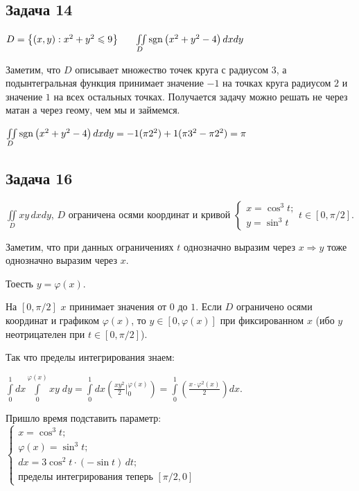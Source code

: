 \documentclass[a4paper, fleqn]{article}
\begin{document}
    \subsection*{Задача 14}
    $D = \left\{ (x, y): x^2 + y^2 \leqslant 9 \right\} \;\;\;\;\;\; \iint \limits_D \operatorname{\mathop{\mathrm{sgn}}} \left( x^2 + y^2 - 4 \right) dx dy$ 

    Заметим, что $D$ описывает множество точек круга с радиусом $3$, а подынтегральная функция принимает значение 
    $-1$ на точках круга радиусом $2$ и значение $1$ на всех остальных точках. 
    Получается задачу можно решать не через матан а через геому, чем мы и займемся.

    $\iint \limits_D \operatorname{\mathop{\mathrm{sgn}}} \left( x^2 + y^2 - 4 \right) dx dy = - 1 (\pi 2^2) + 1 (\pi 3^2 - \pi 2^2) = \pi$

    
    \subsection*{Задача 16}
    
    $\iint\limits_D xy \, dxdy$, $D$ ограничена осями координат и кривой $\begin{cases} 
    x = \cos^3 t;\\
    y = \sin^3 t
    \end{cases} t \in [0, \pi / 2].$
    
    Заметим, что при данных ограничениях $t$ однозначно выразим через $x \Rightarrow y$  тоже однозначно выразим через $x$.
    
    Тоесть $y = \varphi(x)$.
    
    На $[0, \pi/2]$ $x$ принимает значения от $0$ до $1$. Если $D$ ограничено осями координат и графиком $\varphi(x)$, то $y \in [0, \varphi(x)]$ при фиксированном $x$  (ибо $y$ неотрицателен при $t \in [0, \pi/2]$).
     
     Так что пределы интегрирования знаем:
     
     $\int\limits_{0}^{1} dx \int\limits_{0}^{\varphi(x)} xy \; dy = \int\limits_{0}^{1} dx \left( \frac{xy^2}{2}  \Bigg|_{0}^{\varphi(x)}
     \right)  = \int\limits_{0}^{1}  \left( \frac{x \cdot \varphi^2(x)}{2}\right) dx.$
     
     Пришло время подставить параметр: $\begin{cases} x = \cos^3 t;\\
     \varphi(x) = \sin^3 t;\\
     dx = 3 \cos^2 t \cdot (-\sin t) \, dt;\\
     \text{пределы интегрирования теперь } [\pi/2, 0]
     \end{cases}$
     
\end{document}
